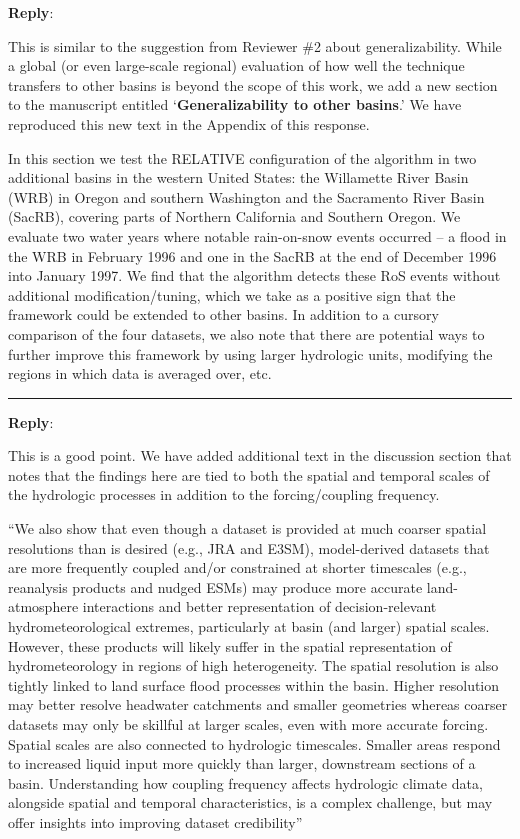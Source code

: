 \documentclass{article}
\newcommand{\genDisc}[1]{\medskip \hrule \vspace{0.25cm}
               {\itshape {\color{violet}{#1}\color{black}} }}
\newcommand{\reply}{\vspace{0.25cm} \textbf{Reply}:\ }
\begin{document}
\reply{This is similar to the suggestion from Reviewer \#2 about generalizability. While a global (or even large-scale regional) evaluation of how well the technique transfers to other basins is beyond the scope of this work, we add a new section to the manuscript entitled {\color{Orange}`\textbf{Generalizability to other basins}.'} We have reproduced this new text in the Appendix of this response.

In this section we test the RELATIVE configuration of the algorithm in two additional basins in the western United States: the Willamette River Basin (WRB) in Oregon and southern Washington and the Sacramento River Basin (SacRB), covering parts of Northern California and Southern Oregon. We evaluate two water years where notable rain-on-snow events occurred -- a flood in the WRB in February 1996 and one in the SacRB at the end of December 1996 into January 1997. We find that the algorithm detects these RoS events without additional modification/tuning, which we take as a positive sign that the framework could be extended to other basins. In addition to a cursory comparison of the four datasets, we also note that there are potential ways to further improve this framework by using larger hydrologic units, modifying the regions in which data is averaged over, etc.}

\genDisc{The timescale over which RoS are relevant will be very dependent on the spatial scale of the watershed. For example, headwater catchments may need timescales of hours whereas for large basins it may be multiple days. Can this be discussed?}

\reply{This is a good point. We have added additional text in the discussion section that notes that the findings here are tied to both the spatial and temporal scales of the hydrologic processes in addition to the forcing/coupling frequency.

{\color{Orange}``We also show that even though a dataset is provided at much coarser spatial resolutions than is desired (e.g., JRA and E3SM), model-derived datasets that are more frequently coupled and/or constrained at shorter timescales (e.g., reanalysis products and nudged ESMs) may produce more accurate land-atmosphere interactions and better representation of decision-relevant hydrometeorological extremes, particularly at basin (and larger) spatial scales. However, these products will likely suffer in the spatial representation of hydrometeorology in regions of high heterogeneity. The spatial resolution is also tightly linked to land surface flood processes within the basin. Higher resolution may better resolve headwater catchments and smaller geometries whereas coarser datasets may only be skillful at larger scales, even with more accurate forcing. Spatial scales are also connected to hydrologic timescales. Smaller areas respond to increased liquid input more quickly than larger, downstream sections of a basin. Understanding how coupling frequency affects hydrologic climate data, alongside spatial and temporal characteristics, is a complex challenge, but may offer insights into improving dataset credibility''}}
\end{document}
